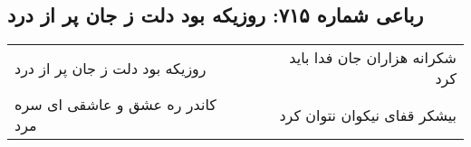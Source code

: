 \begin{center}
\section*{رباعی شماره ۷۱۵: روزیکه بود دلت ز جان پر از درد}
\label{sec:0715}
\begin{longtable}{l p{0.5cm} r}
روزیکه بود دلت ز جان پر از درد
&&
شکرانه هزاران جان فدا باید کرد
\\
کاندر ره عشق و عاشقی ای سره مرد
&&
بیشکر قفای نیکوان نتوان کرد
\\
\end{longtable}
\end{center}
